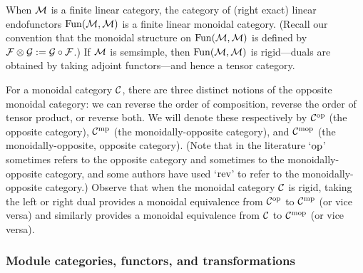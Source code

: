 \documentclass{amsart}
\begin{document}
\begin{example}
When $\mathcal M$ is a finite linear category, the category of (right exact) linear endofunctors $\operatorname{Fun}(\mathcal M,\mathcal M)$ is a finite linear monoidal category.  (Recall our convention that the monoidal structure on $\operatorname{Fun}(\mathcal M,\mathcal M)$ is defined by $\mathcal F \otimes \mathcal G := \mathcal G \circ \mathcal F$.)  If $\mathcal M$ is semsimple, then $\operatorname{Fun}(\mathcal M,\mathcal M)$ is rigid---duals are obtained by taking adjoint functors---and hence a tensor category.
\end{example} %

For a monoidal category $\mathcal C$, there are three distinct notions of the opposite monoidal category: we can reverse the order of composition, reverse the order of tensor product, or reverse both.  We will denote these respectively by $\mathcal C^{\mathrm{op}}$ (the opposite category), $\mathcal C^{\mathrm{mp}}$ (the monoidally-opposite category), and $\mathcal C^{\mathrm{mop}}$ (the monoidally-opposite, opposite category).  (Note that in the literature `$\mathrm{op}$' sometimes refers to the opposite category and sometimes to the monoidally-opposite category, and some authors have used `$\mathrm{rev}$' to refer to the monoidally-opposite category.)  Observe that when the monoidal category $\mathcal C$ is rigid, taking the left or right dual provides a monoidal equivalence from $\mathcal C^{\mathrm{op}}$ to $\mathcal C^{\mathrm{mp}}$ (or vice versa) and similarly provides a monoidal equivalence from $\mathcal C$ to $\mathcal C^{\mathrm{mop}}$ (or vice versa).

\subsubsection{Module categories, functors, and transformations}
\end{document}

